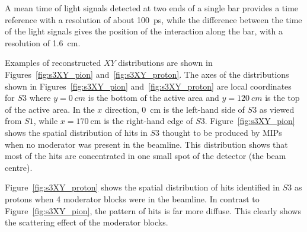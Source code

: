A mean time of light signals detected at two ends of a single bar provides a time reference with a resolution of about 100~ps, while the difference between the time of the light signals gives the position of the interaction along the bar, with a resolution of 1.6~cm.

Examples of reconstructed $XY$ distributions are shown in Figures~\ref{fig:s3XY_pion} and~\ref{fig:s3XY_proton}.
The axes of the distributions shown in Figures~\ref{fig:s3XY_pion} and~\ref{fig:s3XY_proton} are local coordinates for $\mathit{S3}$ where $y=0~cm$ is the bottom of the active area and $y=120~cm$ is the top of the active area.
In the $x$ direction, 0~cm is the left-hand side of $\mathit{S3}$ as viewed from $\mathit{S1}$, while $x = 170~\text{cm}$ is the right-hand edge of $\mathit{S3}$.
Figure~\ref{fig:s3XY_pion} shows the spatial distribution of hits in $\mathit{S3}$ thought to be produced by MIPs when no moderator was present in the beamline.
This distribution shows that most of the hits are concentrated in one small spot of the detector (the beam centre).

Figure~\ref{fig:s3XY_proton} shows the spatial distribution of hits identified in $\mathit{S3}$ as protons when 4 moderator blocks were in the beamline.
In contrast to Figure~\ref{fig:s3XY_pion}, the pattern of hits is far more diffuse.
This clearly shows the scattering effect of the moderator blocks.


